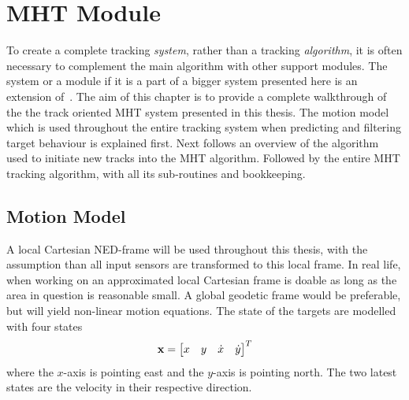 
\chapter{MHT Module}\label{chapter:mht-module}
To create a complete tracking \emph{system}, rather than a tracking \emph{algorithm}, it is often necessary  to complement the main algorithm with other support modules. The system or a module if it is a part of a bigger system presented here is an extension of~\cite{Liland_2017}.
The aim of this chapter is to provide a complete walkthrough of the the track oriented MHT system presented in this thesis. The motion model which is used throughout the entire tracking system when predicting and filtering target behaviour is explained first. Next follows an overview of the algorithm used to initiate new tracks into the MHT algorithm. Followed by the entire MHT tracking algorithm, with all its sub-routines and bookkeeping. 

\section{Motion Model}\label{sec:motion-model}
A local Cartesian NED-frame will be used throughout this thesis, with the assumption than all input sensors are transformed to this local frame. In real life, when working on an approximated local Cartesian frame is doable as long as the area in question is reasonable small. A global geodetic frame would be preferable, but will yield non-linear motion equations. The state of the targets are modelled with four states
\begin{equation}
\boldsymbol{\mathbf{x}} = \begin{bmatrix}
x & y & \dot{x} & \dot{y}
\end{bmatrix}^T
\label{eq:state_vector}
\end{equation}
where the \(x\)-axis is pointing east and the \(y\)-axis is pointing north. The two latest states are the velocity in their respective direction. 

